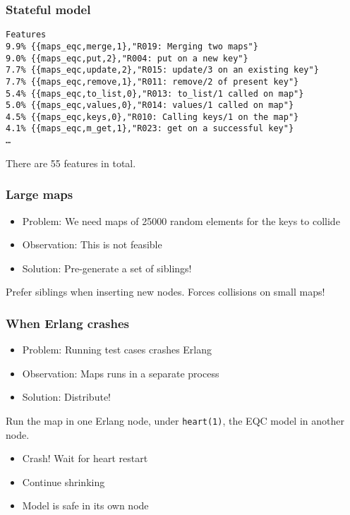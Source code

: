 \documentclass[lualatex]{beamer}
\begin{document}
\begin{frame}[fragile]
\frametitle{Stateful model}
{\small
\begin{verbatim}
Features
9.9% {{maps_eqc,merge,1},"R019: Merging two maps"}
9.0% {{maps_eqc,put,2},"R004: put on a new key"}
7.7% {{maps_eqc,update,2},"R015: update/3 on an existing key"}
7.7% {{maps_eqc,remove,1},"R011: remove/2 of present key"}
5.4% {{maps_eqc,to_list,0},"R013: to_list/1 called on map"}
5.0% {{maps_eqc,values,0},"R014: values/1 called on map"}
4.5% {{maps_eqc,keys,0},"R010: Calling keys/1 on the map"}
4.1% {{maps_eqc,m_get,1},"R023: get on a successful key"}
…
\end{verbatim}
}

There are 55 features in total.
\end{frame}

\begin{frame}
\frametitle{Large maps}

\begin{itemize}
\item Problem: We need maps of 25000 random elements for the keys to collide
\item Observation: This is not feasible
\item Solution: Pre-generate a set of siblings!
\end{itemize}

Prefer siblings when inserting new nodes. Forces collisions on small maps!

\end{frame}

\begin{frame}
\frametitle{When Erlang crashes}

\begin{itemize}
\item Problem: Running test cases crashes Erlang
\item Observation: Maps runs in a separate process
\item Solution: Distribute!
\end{itemize}

Run the map in one Erlang node, under \texttt{heart(1)}, the EQC model in another node.

\begin{itemize}
\item Crash! Wait for heart restart
\item Continue shrinking
\item Model is safe in its own node
\end{itemize}

\end{frame}
\end{document}
